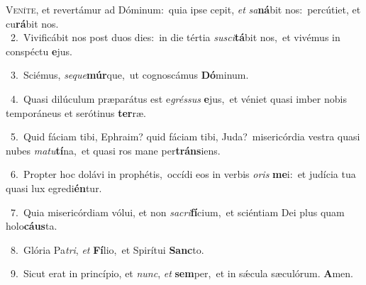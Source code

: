 \lettrine{\initial\textcolor{\initialcolor}{V}}{eníte,} et revertámur ad Dóminum:~\dagger quia ipse cepit, \textit{et} \textit{sa}\-\textbf{ná}bit nos:~\star percútiet, et cu\-\textbf{rá}\-bit nos.\\
{\numbfont\textcolor{\numbcolor}{~2.}}~Vivificábit nos post duos dies:~\dagger in die tértia \textit{su}\-\textit{sci}\textbf{tá}bit nos,~\star et vivémus in conspéctu \textbf{e}\-jus.\par
{\numbfont\textcolor{\numbcolor}{~3.}}~Sciémus, \textit{se}\-\textit{que}\textbf{múr}que,~\star ut cognoscámus \textbf{Dó}\-minum.\par
{\numbfont\textcolor{\numbcolor}{~4.}}~Quasi dilúculum præparátus est e\-\textit{grés}\-\textit{sus} \textbf{e}\-jus,~\star et véniet quasi imber nobis temporáneus et serótinus \textbf{ter}\-ræ.\par
{\numbfont\textcolor{\numbcolor}{~5.}}~Quid fáciam tibi, Ephraim? quid fáciam tibi, Juda?~\dagger misericórdia vestra quasi nubes \textit{ma}\-\textit{tu}\textbf{tí}na,~\star et quasi ros mane per\-\textbf{tráns}\-iens.\par
{\numbfont\textcolor{\numbcolor}{~6.}}~Propter hoc dolávi in prophétis,~\dagger occídi eos in verbis \textit{o}\-\textit{ris} \textbf{me}\-i:~\star et judícia tua quasi lux egredi\-\textbf{én}\-tur.\par
{\numbfont\textcolor{\numbcolor}{~7.}}~Quia misericórdiam vólui, et non \textit{sa}\-\textit{cri}\textbf{fí}cium,~\star et sciéntiam Dei plus quam holo\-\textbf{cáus}\-ta.\par
{\numbfont\textcolor{\numbcolor}{~8.}}~Glória Pa\-\textit{tri}\-, \textit{et} \textbf{Fí}\-lio,~\star et Spirítui \textbf{Sanc}\-to.\par
{\numbfont\textcolor{\numbcolor}{~9.}}~Sicut erat in princípio, et \textit{nunc}\-, \textit{et} \textbf{sem}\-per,~\star et in sǽcula sæculórum. \textbf{A}\-men.\par
